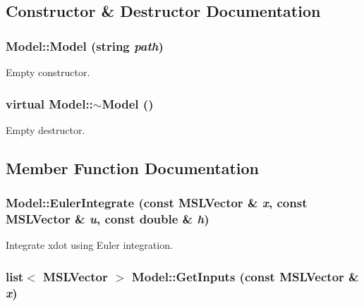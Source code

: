 \subsection{Constructor \& Destructor Documentation}
\subsubsection{\setlength{\rightskip}{0pt plus 5cm}Model::Model (string {\em path})}\label{classModel_a0}


Empty constructor.

\subsubsection{\setlength{\rightskip}{0pt plus 5cm}virtual Model::$\sim$Model ()\hspace{0.3cm}{\tt  [inline, virtual]}}\label{classModel_a1}


Empty destructor.



\subsection{Member Function Documentation}
\subsubsection{ Model::Euler\-Integrate (const {\bf MSLVector} \& {\em x}, const {\bf MSLVector} \& {\em u}, const double \& {\em h})\hspace{0.3cm}{\tt  [protected]}}\label{classModel_b1}


Integrate xdot using Euler integration.

\subsubsection{\setlength{\rightskip}{0pt plus 5cm}list$<$ {\bf MSLVector} $>$ Model::Get\-Inputs (const {\bf MSLVector} \& {\em x})\hspace{0.3cm}{\tt  [virtual]}}\label{classModel_a2}


